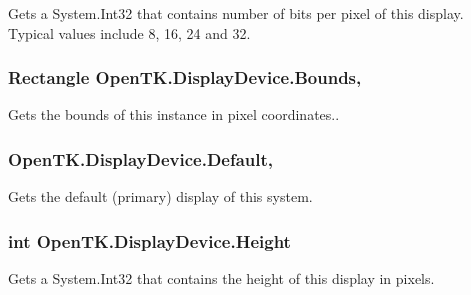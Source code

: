 Gets a System.\-Int32 that contains number of bits per pixel of this display. Typical values include 8, 16, 24 and 32.

\hypertarget{class_open_t_k_1_1_display_device_a8bd53ee06b975cd39ae8c296f42c72ab}{
\subsubsection[{Bounds}]{\setlength{\rightskip}{0pt plus 5cm}Rectangle Open\-T\-K.\-Display\-Device.\-Bounds\hspace{0.3cm}{\ttfamily [get]}, {\ttfamily [set]}}}\label{class_open_t_k_1_1_display_device_a8bd53ee06b975cd39ae8c296f42c72ab}


Gets the bounds of this instance in pixel coordinates.. 

\hypertarget{class_open_t_k_1_1_display_device_a2148505e367fc6d6d66ebfd80a9e91e5}{
\subsubsection[{Default}]{ Open\-T\-K.\-Display\-Device.\-Default\hspace{0.3cm}{\ttfamily [static]}, {\ttfamily [get]}}}\label{class_open_t_k_1_1_display_device_a2148505e367fc6d6d66ebfd80a9e91e5}


Gets the default (primary) display of this system.

\hypertarget{class_open_t_k_1_1_display_device_aa5120fc7bcbcfad2ab9178762b248a8b}{
\subsubsection[{Height}]{\setlength{\rightskip}{0pt plus 5cm}int Open\-T\-K.\-Display\-Device.\-Height\hspace{0.3cm}{\ttfamily [get]}}}\label{class_open_t_k_1_1_display_device_aa5120fc7bcbcfad2ab9178762b248a8b}


Gets a System.\-Int32 that contains the height of this display in pixels.

